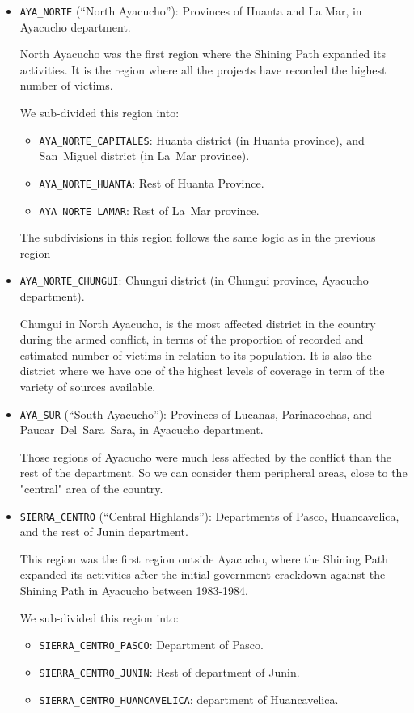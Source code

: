 \documentclass{article}
\begin{document}
\begin{itemize}
  \item \texttt{AYA\_NORTE} (``North Ayacucho''): Provinces of Huanta and La Mar, in Ayacucho department.

    North Ayacucho was the first region where the Shining Path expanded its activities. It is the region where all the projects have recorded the highest number of victims. 

    We sub-divided this region into:
    \begin{itemize}
      \item \texttt{AYA\_NORTE\_CAPITALES}: Huanta district (in Huanta province), and San~Miguel district (in La~Mar province).
      \item \texttt{AYA\_NORTE\_HUANTA}: Rest of Huanta Province. 
      \item \texttt{AYA\_NORTE\_LAMAR}: Rest of La~Mar province.
    \end{itemize}

The subdivisions in this region follows the same logic as in the previous region

  \item \texttt{AYA\_NORTE\_CHUNGUI}: Chungui district (in Chungui province, Ayacucho department).

    Chungui in North Ayacucho, is the most affected district in the country during the armed conflict, in terms of the proportion of recorded and estimated number of victims in relation to its population. It is also the district where we have one of the highest levels of coverage in term of the variety of sources available. 

  \item \texttt{AYA\_SUR} (``South Ayacucho''): Provinces of Lucanas, Parinacochas, and Paucar~Del~Sara~Sara, in Ayacucho department.

    Those regions of Ayacucho were much less affected by the conflict than the rest of the department. So we can consider them peripheral areas, close to the "central" area of the country. 

 \item \texttt{SIERRA\_CENTRO} (``Central Highlands''): Departments of Pasco, Huancavelica, and the rest of Junin department.

    This region was the first region outside Ayacucho, where the Shining Path expanded its activities after the initial government crackdown against the Shining Path in Ayacucho between 1983-1984. 

    We sub-divided this region into:
    \begin{itemize}
      \item \texttt{SIERRA\_CENTRO\_PASCO}: Department of Pasco.
      \item \texttt{SIERRA\_CENTRO\_JUNIN}: Rest of department of Junin.
      \item \texttt{SIERRA\_CENTRO\_HUANCAVELICA}: department of Huancavelica.
    \end{itemize}
    

\end{itemize}
\end{document}
